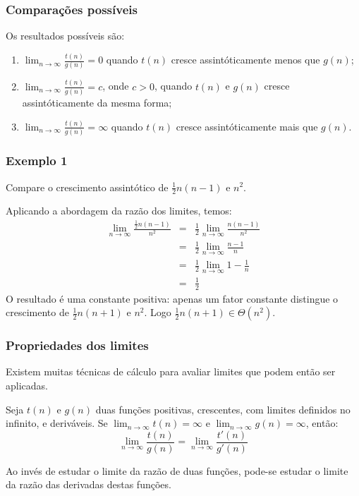 \documentclass{beamer}
\begin{document}
\begin{frame}
\frametitle{Comparações possíveis}
Os resultados possíveis são:
\begin{enumerate}
\item $\lim_{n \to \infty} \frac{t(n)}{g(n)} = 0$ quando $t(n)$ cresce assintóticamente menos que $g(n)$;


\item $\lim_{n \to \infty} \frac{t(n)}{g(n)} = c$, onde $c > 0$, quando $t(n)$ e
$g(n)$ cresce assintóticamente da mesma forma;


\item $\lim_{n \to \infty} \frac{t(n)}{g(n)} = \infty$ quando $t(n)$ cresce assintóticamente mais que $g(n)$.

\end{enumerate}

\end{frame}

\begin{frame}
\frametitle{Exemplo 1}
\begin{problem}
Compare o crescimento assintótico de $\frac{1}{2} n (n-1)$ e $n^2$.
\end{problem}
\pause
\begin{solution}
Aplicando a abordagem da razão dos limites, temos:
\begin{eqnarray*}
\lim_{n \to \infty} \frac{\frac{1}{2} n (n-1)}{n^2} & = & \frac{1}{2} \lim_{n \to \infty} \frac{n (n-1)}{n^2} \\
& = & \frac{1}{2} \lim_{n \to \infty} \frac{n-1}{n} \\
& = & \frac{1}{2} \lim_{n \to \infty} 1 - \frac{1}{n} \\
& = & \frac{1}{2}
\end{eqnarray*}
O resultado é uma constante positiva: apenas um fator constante distingue
o crescimento de $\frac{1}{2} n(n+1)$ e $n^2$. Logo $\frac{1}{2} n (n+1) \in \Theta(n^2)$.
\end{solution}
\end{frame}

\begin{frame}
\frametitle{Propriedades dos limites}
Existem muitas técnicas de cálculo para avaliar limites que podem então ser aplicadas.

\begin{theorem}
  Seja $t(n)$ e $g(n)$ duas funções positivas, crescentes, com limites definidos
  no infinito, e deriváveis.  Se $\lim_{n \to \infty} t(n) = \infty$ e $\lim_{n
    \to \infty} g(n) = \infty$, então:
$$\lim_{n \to \infty} \frac{t(n)}{g(n)} = \lim_{n \to \infty} \frac{t'(n)}{g'(n)}$$
\end{theorem}

Ao invés de estudar o limite da razão de duas funções, pode-se estudar o limite
da razão das derivadas destas funções.
\end{frame}
\end{document}

